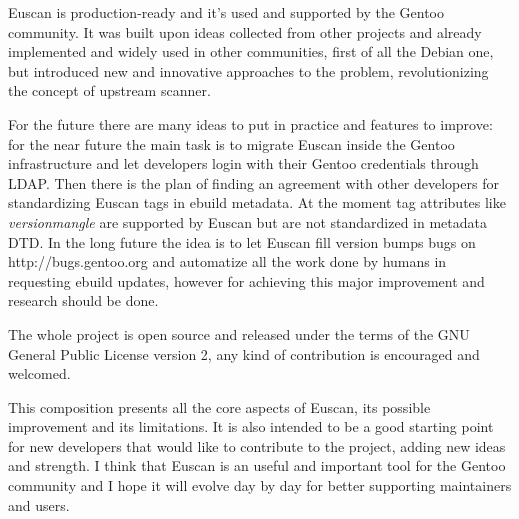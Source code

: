 
Euscan is production-ready and it's used and supported by the Gentoo community. It was built upon ideas collected from other projects and already implemented and widely used in other communities, first of all the Debian one, but introduced new and innovative approaches to the problem, revolutionizing the concept of upstream scanner.

For the future there are many ideas to put in practice and features to improve: for the near future the main task is to migrate Euscan inside the Gentoo infrastructure and let developers login with their Gentoo credentials through LDAP. Then there is the plan of finding an agreement with other developers for standardizing Euscan tags in ebuild metadata. At the moment tag attributes like \emph{versionmangle} are supported by Euscan but are not standardized in metadata DTD.
In the long future the idea is to let Euscan fill version bumps bugs on http://bugs.gentoo.org and automatize all the work done by humans in requesting ebuild updates, however for achieving this major improvement and research should be done.

The whole project is open source and released under the terms of the GNU General Public License version 2, any kind of contribution is encouraged and welcomed.

This composition presents all the core aspects of Euscan, its possible improvement and its limitations. It is also intended to be a good starting point for new developers that would like to contribute to the project, adding new ideas and strength.
I think that Euscan is an useful and important tool for the Gentoo community and I hope it will evolve day by day for better supporting maintainers and users.

